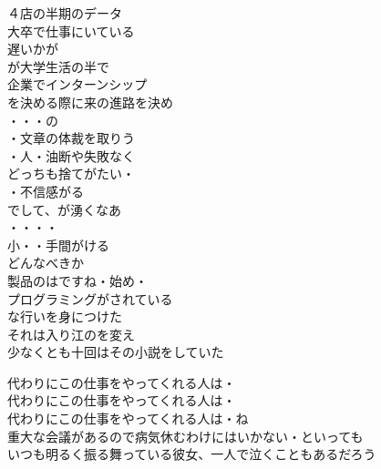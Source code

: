 \begin{multicols}{2}
４店の半期のデータ\\
大卒で仕事にいている\\
遅いかが\\
が大学生活の半で\\
企業でインターンシップ\\
を決める際に来の進路を決め\\

・・・の\\
・文章の体裁を取りう\\

・人・油断や失敗なく\\
どっちも捨てがたい・\\
・不信感がる\\
でして、が湧くなあ\\

・・・・\\
小・・手間がける\\
どんなべきか\\
製品のはですね・始め・\\
プログラミングがされている\\

な行いを身につけた\\
それは入り江のを変え\\
少なくとも十回はその小説をしていた\\

\end{multicols}

代わりにこの仕事をやってくれる人は・\\
代わりにこの仕事をやってくれる人は・\\
代わりにこの仕事をやってくれる人は・ね\\
重大な会議があるので病気休むわけにはいかない・といっても\\
いつも明るく振る舞っている彼女、一人で泣くこともあるだろう\\

